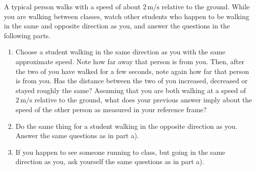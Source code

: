 \begin{exercise}  
  A typical person walks with a speed of about $2\,\text{m/s}$
  relative to the ground.  While you are walking between classes,
  watch other students who happen to be walking in the same and
  opposite direction as you, and answer the questions in the following
  parts.
  \begin{enumerate}
  \item Choose a student walking in the same direction as you with the
    same approximate speed.  Note how far away that person is from
    you.  Then, after the two of you have walked for a few seconds,
    note again how far that person is from you.  Has the distance
    between the two of you increased, decreased or stayed roughly the
    same?  Assuming that you are both walking at a speed of $2\,
    \mbox{m/s}$ relative to the ground, what does your previous answer
    imply about the speed of the other person as measured in your
    reference frame?

  \item Do the same thing for a student walking in the opposite
    direction as you.  Answer the same questions as in part a).

  \item If you happen to see someone running to class, but going in
    the same direction as you, ask yourself the same questions as in
    part a).
  \end{enumerate}
\end{exercise}

